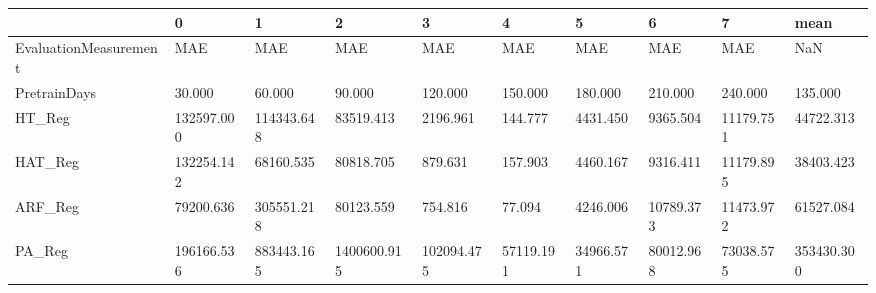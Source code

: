 \begin{tabular}{llllllllll}
\toprule
{} &          0 &          1 &           2 &          3 &         4 &         5 &         6 &         7 &       mean \\
\midrule
EvaluationMeasurement &        MAE &        MAE &         MAE &        MAE &       MAE &       MAE &       MAE &       MAE &        NaN \\
PretrainDays          &     30.000 &     60.000 &      90.000 &    120.000 &   150.000 &   180.000 &   210.000 &   240.000 &    135.000 \\
HT\_Reg                & 132597.000 & 114343.648 &   83519.413 &   2196.961 &   144.777 &  4431.450 &  9365.504 & 11179.751 &  44722.313 \\
HAT\_Reg               & 132254.142 &  68160.535 &   80818.705 &    879.631 &   157.903 &  4460.167 &  9316.411 & 11179.895 &  38403.423 \\
ARF\_Reg               &  79200.636 & 305551.218 &   80123.559 &    754.816 &    77.094 &  4246.006 & 10789.373 & 11473.972 &  61527.084 \\
PA\_Reg                & 196166.536 & 883443.165 & 1400600.915 & 102094.475 & 57119.191 & 34966.571 & 80012.968 & 73038.575 & 353430.300 \\
\bottomrule
\end{tabular}
